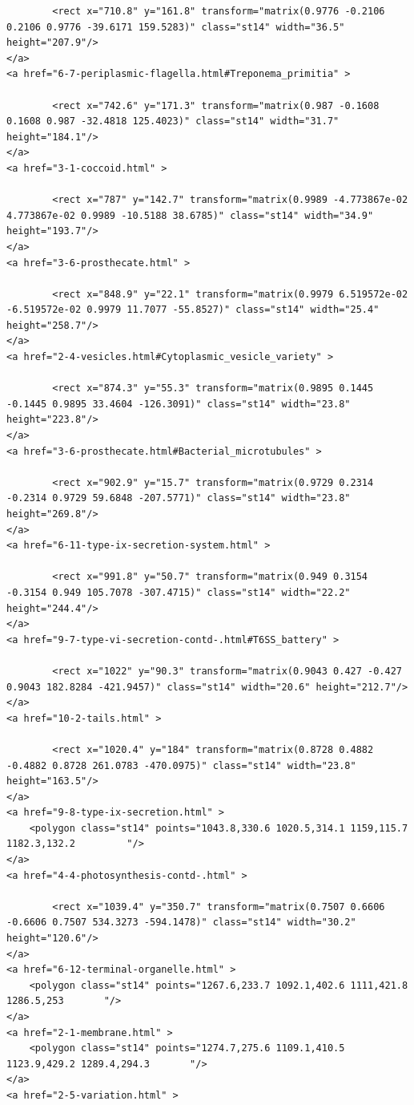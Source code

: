 \documentclass[]{tufte-book}
\begin{document}
\begin{verbatim}
        <rect x="710.8" y="161.8" transform="matrix(0.9776 -0.2106 0.2106 0.9776 -39.6171 159.5283)" class="st14" width="36.5" height="207.9"/>
</a>
<a href="6-7-periplasmic-flagella.html#Treponema_primitia" >

        <rect x="742.6" y="171.3" transform="matrix(0.987 -0.1608 0.1608 0.987 -32.4818 125.4023)" class="st14" width="31.7" height="184.1"/>
</a>
<a href="3-1-coccoid.html" >

        <rect x="787" y="142.7" transform="matrix(0.9989 -4.773867e-02 4.773867e-02 0.9989 -10.5188 38.6785)" class="st14" width="34.9" height="193.7"/>
</a>
<a href="3-6-prosthecate.html" >

        <rect x="848.9" y="22.1" transform="matrix(0.9979 6.519572e-02 -6.519572e-02 0.9979 11.7077 -55.8527)" class="st14" width="25.4" height="258.7"/>
</a>
<a href="2-4-vesicles.html#Cytoplasmic_vesicle_variety" >

        <rect x="874.3" y="55.3" transform="matrix(0.9895 0.1445 -0.1445 0.9895 33.4604 -126.3091)" class="st14" width="23.8" height="223.8"/>
</a>
<a href="3-6-prosthecate.html#Bacterial_microtubules" >

        <rect x="902.9" y="15.7" transform="matrix(0.9729 0.2314 -0.2314 0.9729 59.6848 -207.5771)" class="st14" width="23.8" height="269.8"/>
</a>
<a href="6-11-type-ix-secretion-system.html" >

        <rect x="991.8" y="50.7" transform="matrix(0.949 0.3154 -0.3154 0.949 105.7078 -307.4715)" class="st14" width="22.2" height="244.4"/>
</a>
<a href="9-7-type-vi-secretion-contd-.html#T6SS_battery" >

        <rect x="1022" y="90.3" transform="matrix(0.9043 0.427 -0.427 0.9043 182.8284 -421.9457)" class="st14" width="20.6" height="212.7"/>
</a>
<a href="10-2-tails.html" >

        <rect x="1020.4" y="184" transform="matrix(0.8728 0.4882 -0.4882 0.8728 261.0783 -470.0975)" class="st14" width="23.8" height="163.5"/>
</a>
<a href="9-8-type-ix-secretion.html" >
    <polygon class="st14" points="1043.8,330.6 1020.5,314.1 1159,115.7 1182.3,132.2         "/>
</a>
<a href="4-4-photosynthesis-contd-.html" >

        <rect x="1039.4" y="350.7" transform="matrix(0.7507 0.6606 -0.6606 0.7507 534.3273 -594.1478)" class="st14" width="30.2" height="120.6"/>
</a>
<a href="6-12-terminal-organelle.html" >
    <polygon class="st14" points="1267.6,233.7 1092.1,402.6 1111,421.8 1286.5,253       "/>
</a>
<a href="2-1-membrane.html" >
    <polygon class="st14" points="1274.7,275.6 1109.1,410.5 1123.9,429.2 1289.4,294.3       "/>
</a>
<a href="2-5-variation.html" >


\end{verbatim}
\end{document}
